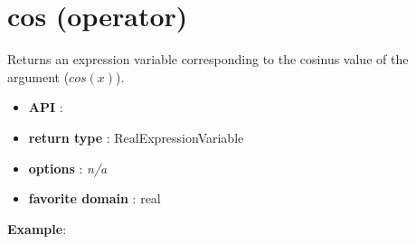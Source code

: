 \label{cos}
\hypertarget{cos}{}

\section{cos (operator)}\label{cos:cosoperator}\hypertarget{cos:cosoperator}{}
Returns an expression variable corresponding to the cosinus value of the argument (\(cos(x)\)).

\begin{itemize}
	\item \textbf{API} : 
	\item \textbf{return type} : RealExpressionVariable
	\item \textbf{options} : \emph{n/a}
	\item \textbf{favorite domain} : real
\end{itemize}

\textbf{Example}:

